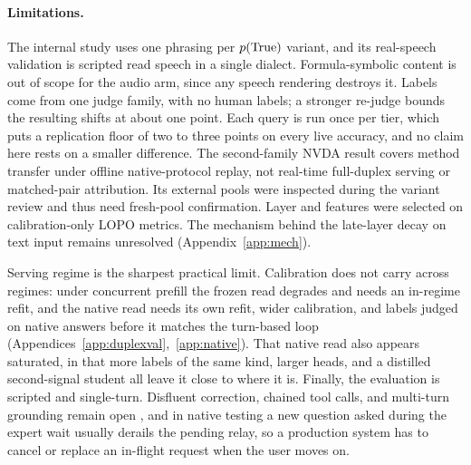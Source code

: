 \paragraph{Limitations.}
The internal study uses one phrasing per $p(\mathrm{True})$ variant, and its
real-speech validation is scripted read speech in a single dialect.
Formula-symbolic content is out of scope for the audio arm, since any
speech rendering destroys it. Labels come from one judge family, with
no human labels; a stronger re-judge bounds the resulting shifts at
about one point. Each query is run once per tier, which puts a
replication floor of two to three points on every live accuracy, and
no claim here rests on a smaller difference. The second-family
NVDA result covers method transfer under offline native-protocol
replay, not real-time full-duplex serving or matched-pair attribution.
Its external pools were inspected during the variant review and thus
need fresh-pool confirmation. Layer and features were selected on
calibration-only LOPO metrics. The mechanism behind the late-layer
decay on text input remains
unresolved (Appendix~\ref{app:mech}).

Serving regime is the sharpest practical limit. Calibration does not
carry across regimes: under concurrent prefill the frozen read
degrades and needs an in-regime refit, and the native read needs its
own refit, wider calibration, and labels judged on native answers
before it matches the turn-based loop
(Appendices~\ref{app:duplexval},~\ref{app:native}). That native read
also appears saturated, in that more labels of the same kind, larger
heads, and a distilled second-signal student all leave it close to
where it is. Finally, the evaluation is scripted and single-turn.
Disfluent correction, chained tool calls, and multi-turn grounding
remain open \citep{lin2026fdbv3}, and in native testing a new
question asked during the expert wait usually derails the pending
relay, so a production system has to cancel or replace an in-flight
request when the user moves on.
